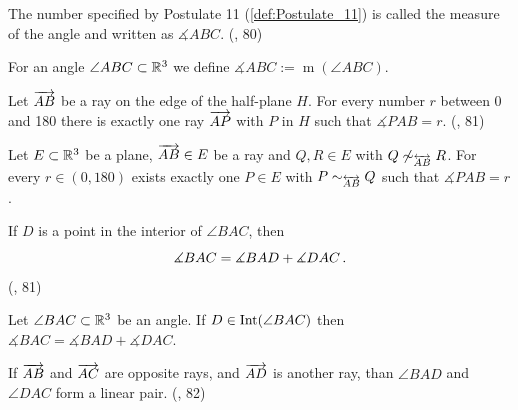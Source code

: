 \begin{definition}\label{def:Angle_Measure}
  The number specified by Postulate 11 (\ref{def:Postulate_11}) is called the measure of the angle and written as $\measuredangle{ABC}$.
  (\cite{SMSGGeometry}, 80)

  For an angle $\angle{ABC} \subset \mathbb{R}^3$ we define $\measuredangle{ABC}:=\operatorname{m}(\angle{ABC})$.
\end{definition}

\begin{definition}\label{def:Postulate_12}
  Let $\overrightarrow{AB}$ be a ray on the edge of the half-plane $H$.
  For every number $r$ between 0 and 180 there is exactly one ray $\overrightarrow{AP}$ with $P$ in $H$ such that $\measuredangle{PAB}=r$.
  (\cite{SMSGGeometry}, 81)

  Let $E \subset \mathbb{R}^3$ be a plane, $\overrightarrow{AB}\in E$ be a ray and $Q,R \in E$ with $Q\not\sim_{\overleftrightarrow{AB}}R$.
  For every $r \in (0,180)$ exists exactly one $P \in E$ with $P\sim_{\overleftrightarrow{AB}}Q$ such that $\measuredangle{PAB}=r$.
\end{definition}



\begin{definition}\label{def:Postulate_13}
  If $D$ is a point in the interior of $\angle{BAC}$, then
  \[
  \measuredangle{BAC}=\measuredangle{BAD}+\measuredangle{DAC}\, \text{.}
  \]
  (\cite{SMSGGeometry}, 81)

  Let $\angle{BAC}\subset\mathbb{R}^3$ be an angle.
  If $D \in \operatorname{Int}({\angle{BAC}})$ then $\measuredangle{BAC}=\measuredangle{BAD}+\measuredangle{DAC}$.
\end{definition}

\begin{definition}\label{def:Linear_Pair}
  If $\overrightarrow{AB}$ and $\overrightarrow{AC}$ are opposite rays, and $\overrightarrow{AD}$ is another ray, than $\angle{BAD}$ and $\angle{DAC}$ form a linear pair.
  (\cite{SMSGGeometry}, 82)

\end{definition}

